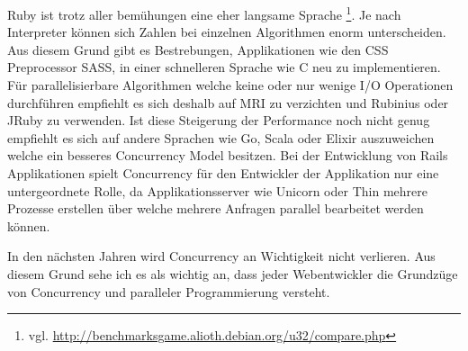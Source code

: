 Ruby ist trotz aller bemühungen eine eher langsame Sprache \footnote{vgl. \url{http://benchmarksgame.alioth.debian.org/u32/compare.php}}. Je nach Interpreter können sich Zahlen bei einzelnen Algorithmen enorm unterscheiden. Aus diesem Grund gibt es Bestrebungen, Applikationen wie den CSS Preprocessor SASS, in einer schnelleren Sprache wie C neu zu implementieren. Für parallelisierbare Algorithmen welche keine oder nur wenige I/O Operationen durchführen empfiehlt es sich deshalb auf MRI zu verzichten und Rubinius oder JRuby zu verwenden. Ist diese Steigerung der Performance noch nicht genug empfiehlt es sich auf andere Sprachen wie Go, Scala oder Elixir auszuweichen welche ein besseres Concurrency Model besitzen. Bei der Entwicklung von Rails Applikationen spielt Concurrency für den Entwickler der Applikation nur eine untergeordnete Rolle, da Applikationsserver wie Unicorn oder Thin mehrere Prozesse erstellen über welche mehrere Anfragen parallel bearbeitet werden können.

In den nächsten Jahren wird Concurrency an Wichtigkeit nicht verlieren. Aus diesem Grund sehe ich es als wichtig an, dass jeder Webentwickler die Grundzüge von Concurrency und paralleler Programmierung versteht.
